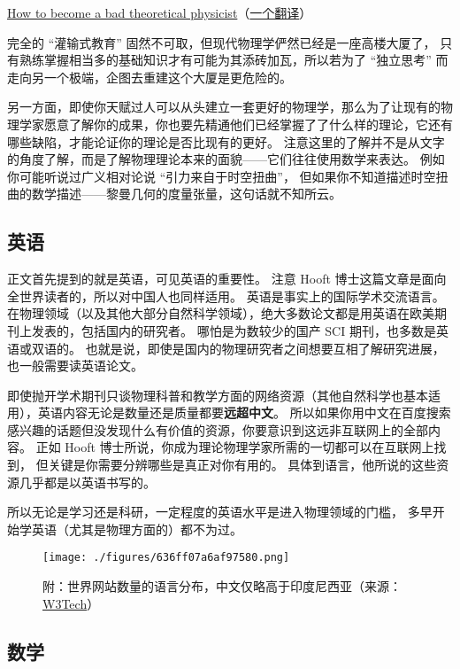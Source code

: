 \href{https://webspace.science.uu.nl/~hooft101/theoristbad.html#:~:text=On\%20your\%20way\%20towards\%20becoming,have\%20your\%20work\%20published\%20anyway.}{How to become a bad theoretical physicist}（\href{https://zhuanlan.zhihu.com/p/38680467}{一个翻译}）

完全的 “灌输式教育” 固然不可取，但现代物理学俨然已经是一座高楼大厦了， 只有熟练掌握相当多的基础知识才有可能为其添砖加瓦，所以若为了 “独立思考” 而走向另一个极端，企图去重建这个大厦是更危险的。

另一方面，即使你天赋过人可以从头建立一套更好的物理学，那么为了让现有的物理学家愿意了解你的成果，你也要先精通他们已经掌握了了什么样的理论，它还有哪些缺陷，才能论证你的理论是否比现有的更好。 注意这里的了解并不是从文字的角度了解，而是了解物理理论本来的面貌——它们往往使用数学来表达。 例如你可能听说过广义相对论说 “引力来自于时空扭曲”， 但如果你不知道描述时空扭曲的数学描述——黎曼几何的度量张量，这句话就不知所云。

\subsection{英语}
正文首先提到的就是英语，可见英语的重要性。 注意 Hooft 博士这篇文章是面向全世界读者的，所以对中国人也同样适用。 英语是事实上的国际学术交流语言。 在物理领域（以及其他大部分自然科学领域），绝大多数论文都是用英语在欧美期刊上发表的，包括国内的研究者。 哪怕是为数较少的国产 SCI 期刊，也多数是英语或双语的。 也就是说，即使是国内的物理研究者之间想要互相了解研究进展，也一般需要读英语论文。

即使抛开学术期刊只谈物理科普和教学方面的网络资源（其他自然科学也基本适用），英语内容无论是数量还是质量都要\textbf{远超中文}。 所以如果你用中文在百度搜索感兴趣的话题但没发现什么有价值的资源，你要意识到这远非互联网上的全部内容。 正如 Hooft 博士所说，你成为理论物理学家所需的一切都可以在互联网上找到， 但关键是你需要分辨哪些是真正对你有用的。 具体到语言，他所说的这些资源几乎都是以英语书写的。

所以无论是学习还是科研，一定程度的英语水平是进入物理领域的门槛， 多早开始学英语（尤其是物理方面的）都不为过。

\begin{figure}[ht]
\centering
\texttt{[image: ./figures/636ff07a6af97580.png]}
\caption{附：世界网站数量的语言分布，中文仅略高于印度尼西亚（来源：\href{https://w3techs.com/technologies/overview/content_language}{W3Tech}）} \label{fig_SdyPhy_2}
\end{figure}

\subsection{数学}
